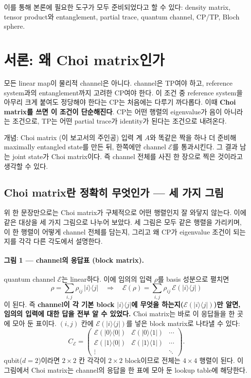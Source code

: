 \documentclass[11pt,a4paper]{article}
\newcommand{\E}{\mathcal{E}}
\theoremstyle{definition}
\theoremstyle{plain}
\theoremstyle{remark}
\begin{document}
이를 통해 본론에 필요한 도구가 모두 준비되었다고 할 수 있다: density matrix, tensor product와 entanglement, partial trace, quantum channel, CP/TP, Bloch sphere.

\section{서론: 왜 Choi matrix인가}

모든 linear map이 물리적 channel은 아니다. channel은 TP여야 하고, reference system과의 entanglement까지 고려한 CP여야 한다. 이 조건 중 reference system을 아무리 크게 붙여도 정당해야 한다는 CP는 처음에는 다루기 까다롭다. 이때 \textbf{Choi matrix를 쓰면 이 조건이 단순해진다}. CP는 어떤 행렬의 eigenvalue가 음이 아니라는 조건으로, TP는 어떤 partial trace가 identity가 된다는 조건으로 내려온다.

\begin{conceptbox}{개념: Choi matrix (이 보고서의 주인공)}
입력 계 $A$와 똑같은 짝을 하나 더 준비해 maximally entangled state를 만든 뒤, 한쪽에만 channel $\E$를 통과시킨다. 그 결과 남는 joint state가 Choi matrix이다. 즉 channel 전체를 사진 한 장으로 찍은 것이라고 생각할 수 있다.
\end{conceptbox}

\subsection{Choi matrix란 정확히 무엇인가 --- 세 가지 그림}

위 한 문장만으로는 Choi matrix가 구체적으로 어떤 행렬인지 잘 와닿지 않는다. 이에 같은 대상을 세 가지 그림으로 나누어 보았다. 세 그림은 모두 같은 행렬을 가리키며, 이 한 행렬이 어떻게 channel 전체를 담는지, 그리고 왜 CP가 eigenvalue 조건이 되는지를 각각 다른 각도에서 설명한다.

\paragraph{그림 1 --- channel의 응답표 (block matrix).}
quantum channel $\E$는 linear하다. 이에 임의의 입력 $\rho$를 basis 성분으로 펼치면
\[
\rho=\sum_{i,j}\rho_{ij}\,|i\rangle\langle j|
\quad\Longrightarrow\quad
\E(\rho)=\sum_{i,j}\rho_{ij}\,\E(|i\rangle\langle j|)
\]
이 된다. 즉 \textbf{channel이 각 기본 block $|i\rangle\langle j|$에 무엇을 하는지($\E(|i\rangle\langle j|)$)만 알면, 임의의 입력에 대한 답을 전부 알 수 있었다.} Choi matrix는 바로 이 응답들을 한 곳에 모아 둔 표이다. $(i,j)$ 칸에 $\E(|i\rangle\langle j|)$를 넣은 block matrix로 나타낼 수 있다:
\[
C_\E=
\begin{pmatrix}
\E(|0\rangle\langle 0|) & \E(|0\rangle\langle 1|) & \cdots\\
\E(|1\rangle\langle 0|) & \E(|1\rangle\langle 1|) & \cdots\\
\vdots & & \ddots
\end{pmatrix}.
\]
qubit($d=2$)이라면 $2\times2$ 칸 각각이 $2\times2$ block이므로 전체는 $4\times4$ 행렬이 된다. 이 그림에서 Choi matrix는 channel의 응답을 한 표에 모아 둔 lookup table에 해당한다.
\end{document}
